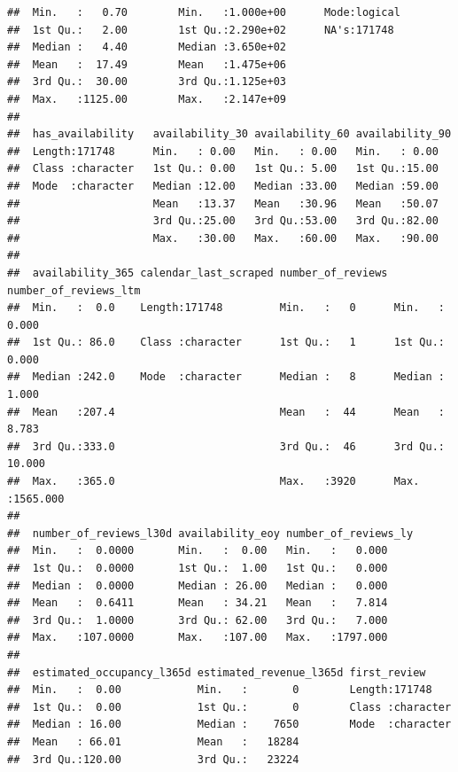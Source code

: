 \documentclass[
]{article}
\begin{document}
\begin{verbatim}
##  Min.   :   0.70        Min.   :1.000e+00      Mode:logical    
##  1st Qu.:   2.00        1st Qu.:2.290e+02      NA's:171748     
##  Median :   4.40        Median :3.650e+02                      
##  Mean   :  17.49        Mean   :1.475e+06                      
##  3rd Qu.:  30.00        3rd Qu.:1.125e+03                      
##  Max.   :1125.00        Max.   :2.147e+09                      
##                                                                
##  has_availability   availability_30 availability_60 availability_90
##  Length:171748      Min.   : 0.00   Min.   : 0.00   Min.   : 0.00  
##  Class :character   1st Qu.: 0.00   1st Qu.: 5.00   1st Qu.:15.00  
##  Mode  :character   Median :12.00   Median :33.00   Median :59.00  
##                     Mean   :13.37   Mean   :30.96   Mean   :50.07  
##                     3rd Qu.:25.00   3rd Qu.:53.00   3rd Qu.:82.00  
##                     Max.   :30.00   Max.   :60.00   Max.   :90.00  
##                                                                    
##  availability_365 calendar_last_scraped number_of_reviews number_of_reviews_ltm
##  Min.   :  0.0    Length:171748         Min.   :   0      Min.   :   0.000     
##  1st Qu.: 86.0    Class :character      1st Qu.:   1      1st Qu.:   0.000     
##  Median :242.0    Mode  :character      Median :   8      Median :   1.000     
##  Mean   :207.4                          Mean   :  44      Mean   :   8.783     
##  3rd Qu.:333.0                          3rd Qu.:  46      3rd Qu.:  10.000     
##  Max.   :365.0                          Max.   :3920      Max.   :1565.000     
##                                                                                
##  number_of_reviews_l30d availability_eoy number_of_reviews_ly
##  Min.   :  0.0000       Min.   :  0.00   Min.   :   0.000    
##  1st Qu.:  0.0000       1st Qu.:  1.00   1st Qu.:   0.000    
##  Median :  0.0000       Median : 26.00   Median :   0.000    
##  Mean   :  0.6411       Mean   : 34.21   Mean   :   7.814    
##  3rd Qu.:  1.0000       3rd Qu.: 62.00   3rd Qu.:   7.000    
##  Max.   :107.0000       Max.   :107.00   Max.   :1797.000    
##                                                              
##  estimated_occupancy_l365d estimated_revenue_l365d first_review      
##  Min.   :  0.00            Min.   :       0        Length:171748     
##  1st Qu.:  0.00            1st Qu.:       0        Class :character  
##  Median : 16.00            Median :    7650        Mode  :character  
##  Mean   : 66.01            Mean   :   18284                          
##  3rd Qu.:120.00            3rd Qu.:   23224                          

\end{verbatim}
\end{document}
